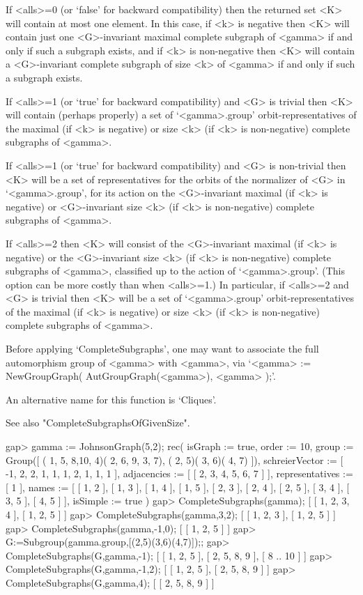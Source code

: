 If <alls>=0 (or `false' for backward compatibility) then the returned
set <K> will contain at most one element. In this case, if <k> is
negative then <K> will contain just one <G>-invariant maximal complete
subgraph of <gamma> if and only if such a subgraph exists, and if <k>
is non-negative then <K> will contain a <G>-invariant complete subgraph
of size <k> of <gamma> if and only if such a subgraph exists.

If <alls>=1 (or `true' for backward compatibility) and <G> is trivial
then <K> will contain (perhaps properly) a set of `<gamma>.group'
orbit-representatives of the maximal (if <k> is negative) or size <k>
(if <k> is non-negative) complete subgraphs of <gamma>.

If <alls>=1 (or `true' for backward compatibility) and <G> is non-trivial
then <K> will be a set of representatives for the orbits of the normalizer
of <G> in `<gamma>.group', for its action on the <G>-invariant maximal
(if <k> is negative) or <G>-invariant size <k> (if <k> is non-negative)
complete subgraphs of <gamma>.

If <alls>=2 then <K> will consist of the <G>-invariant maximal (if <k> is
negative) or the <G>-invariant size <k> (if <k> is non-negative) complete
subgraphs of <gamma>, classified up to the action of `<gamma>.group'.
(This option can be more costly than when <alls>=1.)  In particular, if
<alls>=2 and <G> is trivial then <K> will be a set of `<gamma>.group'
orbit-representatives of the maximal (if <k> is negative) or size <k>
(if <k> is non-negative) complete subgraphs of <gamma>.

Before applying `CompleteSubgraphs', one may want to associate the full
automorphism group of <gamma> with <gamma>, via `<gamma> :=
NewGroupGraph( AutGroupGraph(<gamma>), <gamma> );'.

An alternative name for this function is `Cliques'.

See also "CompleteSubgraphsOfGivenSize".

\beginexample
gap> gamma := JohnsonGraph(5,2);
rec( isGraph := true, order := 10, 
  group := Group([ ( 1, 5, 8,10, 4)( 2, 6, 9, 3, 7), ( 2, 5)( 3, 6)( 4, 7) ]),
  schreierVector := [ -1, 2, 2, 1, 1, 1, 2, 1, 1, 1 ], 
  adjacencies := [ [ 2, 3, 4, 5, 6, 7 ] ], representatives := [ 1 ], 
  names := [ [ 1, 2 ], [ 1, 3 ], [ 1, 4 ], [ 1, 5 ], [ 2, 3 ], [ 2, 4 ], 
      [ 2, 5 ], [ 3, 4 ], [ 3, 5 ], [ 4, 5 ] ], isSimple := true )
gap> CompleteSubgraphs(gamma);
[ [ 1, 2, 3, 4 ], [ 1, 2, 5 ] ]
gap>  CompleteSubgraphs(gamma,3,2);
[ [ 1, 2, 3 ], [ 1, 2, 5 ] ]
gap> CompleteSubgraphs(gamma,-1,0);
[ [ 1, 2, 5 ] ]
gap> G:=Subgroup(gamma.group,[(2,5)(3,6)(4,7)]);;
gap> CompleteSubgraphs(G,gamma,-1);
[ [ 1, 2, 5 ], [ 2, 5, 8, 9 ], [ 8 .. 10 ] ]
gap> CompleteSubgraphs(G,gamma,-1,2);
[ [ 1, 2, 5 ], [ 2, 5, 8, 9 ] ]
gap> CompleteSubgraphs(G,gamma,4);
[ [ 2, 5, 8, 9 ] ]
\endexample


